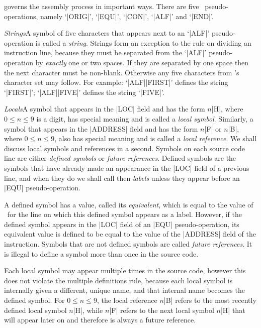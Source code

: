 governs the assembly process in important ways. There are five \MIXAL\ pseudo-operations,
namely `|ORIG|', `|EQU|', `|CON|', `|ALF|' and `|END|'.
\item{\sl Strings}A symbol of five characters that appears next to an `|ALF|'
pseudo-operation is called a {\it string}. Strings form an exception to the rule
on dividing an instruction line, because they must be separated from the `|ALF|'
pseudo-operation by {\it exactly} one or two spaces. If they are separated by
one space then the next character must be non-blank. Otherwise any five characters
from \MIX's character set may follow. For example: `|ALF|\]|FIRST|' defines the
string `|FIRST|'; `|ALF|\]\]\]|FIVE|' defines the string `\]|FIVE|'.
\item{\sl Locals}A symbol that appears in the |LOC| field and has the
form $n$|H|, where $0\leq n\leq 9$ is a digit, has special meaning and is called a
{\it local symbol}. Similarly, a symbol that appears in the |ADDRESS| field and has the
form $n$|F| or $n$|B|, where $0\leq n\leq 9$, also has special meaning and
is called a {\it local reference}. We shall discuss local symbols and references
in a second.
\medskip\noindent
Symbols on each source code line are either {\it defined symbols} or {\it future
references}. Defined symbols are the symbols that have already made an appearance 
in the |LOC| field of a previous line, and when they do we shall call then {\it labels\/}
unless they appear before an |EQU| pseudo-operation.

A defined symbol has a value, called its {\it equivalent}, which is equal to the
value of \loccount\ for the line on which this defined symbol appears as a label.
However, if the defined symbol appears in the |LOC| field of an |EQU| pseudo-operation,
its equivalent value is defined to be equal to the value of the |ADDRESS| field of
the instruction. Symbols that are not defined symbols are called {\it future references}.
It is illegal to define a symbol more than once in the source code.

Each local symbol may appear multiple times in the source code, however this does
not violate the multiple definitions rule, because each local symbol is internally
given a different, unique name, and that internal name becomes the defined symbol.
For $0\leq n\leq 9$, the local reference $n$|B| refers to the most recently defined
local symbol $n$|H|, while $n$|F| refers to the next local symbol $n$|H| that will
appear later on and therefore is always a future reference.

